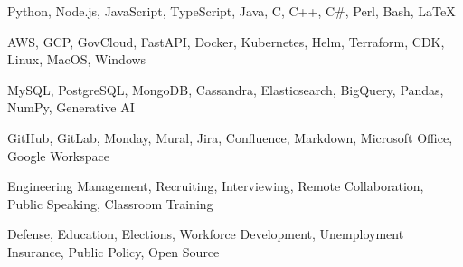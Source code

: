   {Python, Node.js, JavaScript, TypeScript, Java, C, C++, C\#, Perl, Bash, LaTeX}

  {AWS, GCP, GovCloud, FastAPI, Docker, Kubernetes, Helm, Terraform, CDK, Linux, MacOS, Windows}

  {MySQL, PostgreSQL, MongoDB, Cassandra, Elasticsearch, BigQuery, Pandas, NumPy, Generative AI}

  {GitHub, GitLab, Monday, Mural, Jira, Confluence, Markdown, Microsoft Office, Google Workspace}

  {Engineering Management, Recruiting, Interviewing, Remote Collaboration, Public Speaking, Classroom Training}

  {Defense, Education, Elections, Workforce Development, Unemployment Insurance, Public Policy, Open Source}
